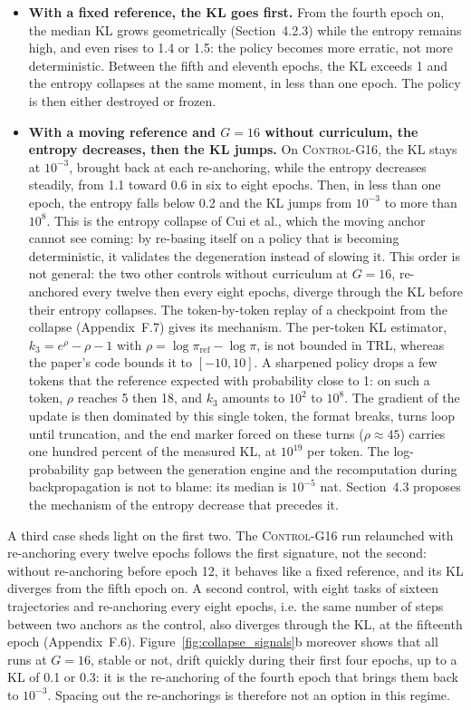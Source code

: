 \documentclass[11pt,a4paper]{article}
\begin{document}
\begin{itemize}
    \item \textbf{With a fixed reference, the KL goes first.} From the fourth epoch on, the median KL grows geometrically (Section~4.2.3) while the entropy remains high, and even rises to 1.4 or 1.5: the policy becomes more erratic, not more deterministic. Between the fifth and eleventh epochs, the KL exceeds 1 and the entropy collapses at the same moment, in less than one epoch. The policy is then either destroyed or frozen.
    \item \textbf{With a moving reference and $G=16$ without curriculum, the entropy decreases, then the KL jumps.} On \textsc{Control-G16}, the KL stays at $10^{-3}$, brought back at each re-anchoring, while the entropy decreases steadily, from 1.1 toward 0.6 in six to eight epochs. Then, in less than one epoch, the entropy falls below 0.2 and the KL jumps from $10^{-3}$ to more than $10^{8}$. This is the entropy collapse of Cui et al., which the moving anchor cannot see coming: by re-basing itself on a policy that is becoming deterministic, it validates the degeneration instead of slowing it. This order is not general: the two other controls without curriculum at $G=16$, re-anchored every twelve then every eight epochs, diverge through the KL before their entropy collapses. The token-by-token replay of a checkpoint from the collapse (Appendix~F.7) gives its mechanism. The per-token KL estimator, $k_3 = e^{\rho} - \rho - 1$ with $\rho = \log \pi_{\mathrm{ref}} - \log \pi$, is not bounded in TRL, whereas the paper's code bounds it to $[-10, 10]$. A sharpened policy drops a few tokens that the reference expected with probability close to 1: on such a token, $\rho$ reaches 5 then 18, and $k_3$ amounts to $10^{2}$ to $10^{8}$. The gradient of the update is then dominated by this single token, the format breaks, turns loop until truncation, and the end marker forced on these turns ($\rho \approx 45$) carries one hundred percent of the measured KL, at $10^{19}$ per token. The log-probability gap between the generation engine and the recomputation during backpropagation is not to blame: its median is $10^{-5}$ nat. Section~4.3 proposes the mechanism of the entropy decrease that precedes it.
\end{itemize}

A third case sheds light on the first two. The \textsc{Control-G16} run relaunched with re-anchoring every twelve epochs follows the first signature, not the second: without re-anchoring before epoch 12, it behaves like a fixed reference, and its KL diverges from the fifth epoch on. A second control, with eight tasks of sixteen trajectories and re-anchoring every eight epochs, i.e. the same number of steps between two anchors as the control, also diverges through the KL, at the fifteenth epoch (Appendix~F.6). Figure~\ref{fig:collapse_signals}b moreover shows that all runs at $G=16$, stable or not, drift quickly during their first four epochs, up to a KL of 0.1 or 0.3: it is the re-anchoring of the fourth epoch that brings them back to $10^{-3}$. Spacing out the re-anchorings is therefore not an option in this regime.
\end{document}
